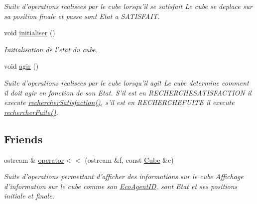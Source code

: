 \begin{CompactItemize}
\begin{CompactList}\small\item\em Suite d'operations realisees par le cube lorsqu'il se satisfait Le cube se deplace sur sa position finale et passe sont Etat a SATISFAIT. \item\end{CompactList}\item 
void \hyperlink{classCube_6687c2575f4ce927f6b3032fb46040eb}{initialiser} ()
\begin{CompactList}\small\item\em Initialisation de l'etat du cube. \item\end{CompactList}\item 
\hypertarget{classCube_9289a4d72b849b7f868b189f531daa62}{
void \hyperlink{classCube_9289a4d72b849b7f868b189f531daa62}{agir} ()}
\label{classCube_9289a4d72b849b7f868b189f531daa62}

\begin{CompactList}\small\item\em Suite d'operations realisees par le cube lorsqu'il agit Le cube determine comment il doit agir en fonction de son Etat. S'il est en RECHERCHESATISFACTION il execute \hyperlink{classCube_10f69d54f313f48ac0c8468628ac6902}{rechercherSatisfaction()}, s'il est en RECHERCHEFUITE il execute \hyperlink{classCube_c81ac3b8da58ba8463d72e3a0433bafa}{rechercherFuite()}. \item\end{CompactList}\end{CompactItemize}
\subsection*{Friends}
\begin{CompactItemize}
\item 
\hypertarget{classCube_73f4a43d36e6b84403eceeebfdf68c56}{
ostream \& \hyperlink{classCube_73f4a43d36e6b84403eceeebfdf68c56}{operator$<$$<$} (ostream \&f, const \hyperlink{classCube}{Cube} \&c)}
\label{classCube_73f4a43d36e6b84403eceeebfdf68c56}

\begin{CompactList}\small\item\em Suite d'operations permettant d'afficher des informations sur le cube Affichage d'information sur le cube comme son \hyperlink{classEcoAgentID}{EcoAgentID}, sont Etat et ses positions initiale et finale. \item\end{CompactList}\end{CompactItemize}


